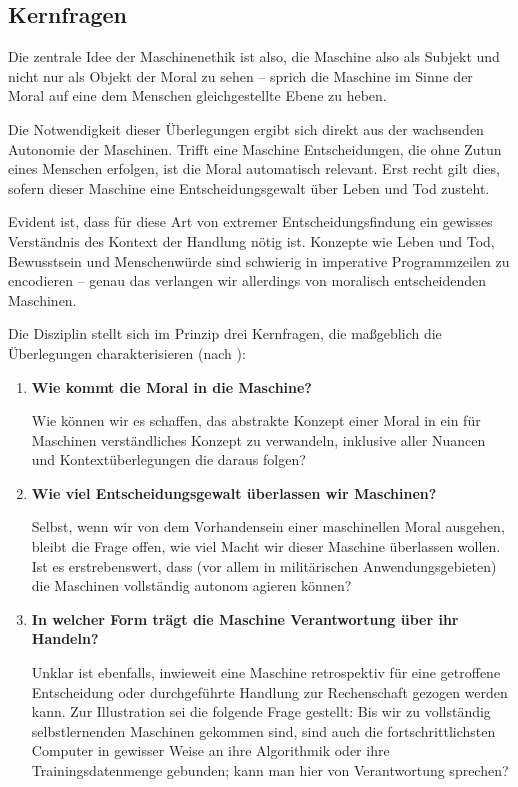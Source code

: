 \documentclass[twocolumn, german]{tum-article}
\begin{document}
\subsection{Kernfragen}
Die zentrale Idee der Maschinenethik ist also, die Maschine also als Subjekt und nicht nur als Objekt der Moral zu sehen -- sprich die Maschine im Sinne der Moral auf eine dem Menschen gleichgestellte Ebene zu heben.

Die Notwendigkeit dieser Überlegungen ergibt sich direkt aus der wachsenden Autonomie der Maschinen. Trifft eine Maschine Entscheidungen, die ohne Zutun eines Menschen erfolgen, ist die Moral automatisch relevant. Erst recht gilt dies, sofern dieser Maschine eine Entscheidungsgewalt über Leben und Tod zusteht.

Evident ist, dass für diese Art von extremer Entscheidungsfindung ein gewisses Verständnis des Kontext der Handlung nötig ist. Konzepte wie Leben und Tod, Bewusstsein und Menschenwürde sind schwierig in imperative Programmzeilen zu encodieren -- genau das verlangen wir allerdings von moralisch entscheidenden Maschinen.

Die Disziplin stellt sich im Prinzip drei Kernfragen, die maßgeblich die Überlegungen charakterisieren (nach \cite[S. 13ff.]{bendel-mascheth}):
\begin{enumerate}
	\item \textbf{Wie kommt die Moral in die Maschine?}

	Wie können wir es schaffen, das abstrakte Konzept einer \glqq Moral\grqq{} in ein für Maschinen verständliches Konzept zu verwandeln, inklusive aller Nuancen und Kontextüberlegungen die daraus folgen?
	
	\item \textbf{Wie viel Entscheidungsgewalt überlassen wir Maschinen?}

	Selbst, wenn wir von dem Vorhandensein einer maschinellen Moral ausgehen, bleibt die Frage offen, wie viel Macht wir dieser Maschine überlassen wollen. Ist es erstrebenswert, dass (vor allem in militärischen Anwendungsgebieten) die Maschinen vollständig autonom agieren können?
	
	\item \textbf{In welcher Form trägt die Maschine Verantwortung über ihr Handeln?}

	Unklar ist ebenfalls, inwieweit eine Maschine retrospektiv für eine getroffene Entscheidung oder durchgeführte Handlung zur Rechenschaft gezogen werden kann. Zur Illustration sei die folgende Frage gestellt: Bis wir zu vollständig selbstlernenden Maschinen gekommen sind, sind auch die fortschrittlichsten Computer in gewisser Weise an ihre Algorithmik oder ihre Trainingsdatenmenge gebunden; kann man hier von Verantwortung sprechen?
\end{enumerate}
\end{document}
